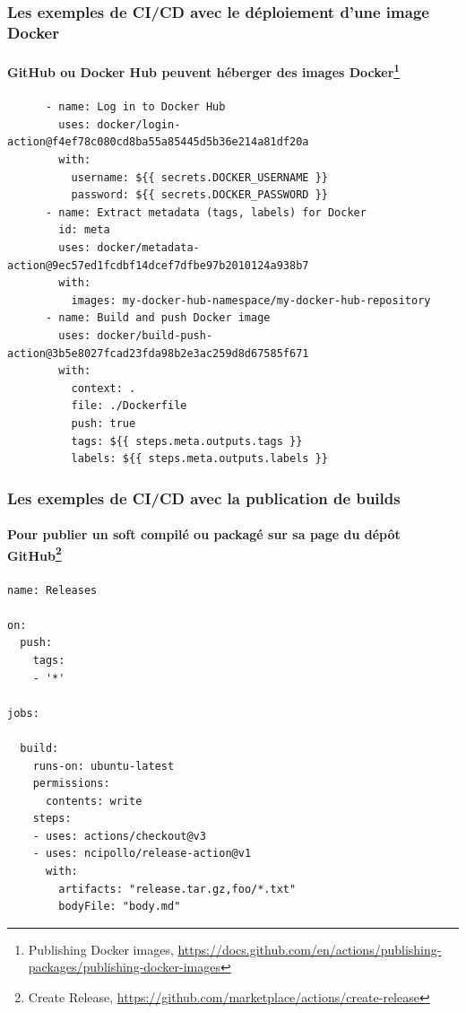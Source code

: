 \documentclass{beamer}
\begin{document}
    \begin{frame}[fragile]
        \frametitle{Les exemples de CI/CD avec le déploiement d'une image Docker}
        \framesubtitle{GitHub ou Docker Hub peuvent héberger des images Docker\footnote{Publishing Docker images, \url{https://docs.github.com/en/actions/publishing-packages/publishing-docker-images}}}
        \transdissolve
        \begin{lstlisting}
      - name: Log in to Docker Hub
        uses: docker/login-action@f4ef78c080cd8ba55a85445d5b36e214a81df20a
        with:
          username: ${{ secrets.DOCKER_USERNAME }}
          password: ${{ secrets.DOCKER_PASSWORD }}
      - name: Extract metadata (tags, labels) for Docker
        id: meta
        uses: docker/metadata-action@9ec57ed1fcdbf14dcef7dfbe97b2010124a938b7
        with:
          images: my-docker-hub-namespace/my-docker-hub-repository
      - name: Build and push Docker image
        uses: docker/build-push-action@3b5e8027fcad23fda98b2e3ac259d8d67585f671
        with:
          context: .
          file: ./Dockerfile
          push: true
          tags: ${{ steps.meta.outputs.tags }}
          labels: ${{ steps.meta.outputs.labels }}
        \end{lstlisting}
    \end{frame}

    \begin{frame}[fragile]
        \frametitle{Les exemples de CI/CD avec la publication de builds}
        \framesubtitle{Pour publier un soft compilé ou packagé sur sa page du dépôt GitHub\footnote{Create Release, \url{https://github.com/marketplace/actions/create-release}}}
        \transdissolve
        \begin{lstlisting}
name: Releases

on:
  push:
    tags:
    - '*'

jobs:

  build:
    runs-on: ubuntu-latest
    permissions:
      contents: write
    steps:
    - uses: actions/checkout@v3
    - uses: ncipollo/release-action@v1
      with:
        artifacts: "release.tar.gz,foo/*.txt"
        bodyFile: "body.md"
        \end{lstlisting}
    \end{frame}
\end{document}

